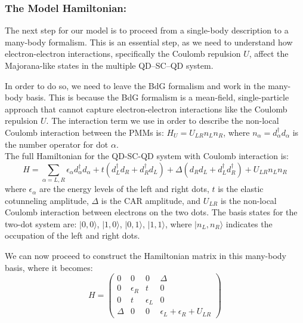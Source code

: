 \documentclass[11pt, letterpaper, titlepage]{article}
\begin{document}
\subsubsection{The Model Hamiltonian:} 
The next step for our model is to proceed from a single-body description to a many-body formalism. This is an essential step, as we need to understand how electron-electron interactions, specifically the Coulomb repulsion $U$, affect the Majorana-like states in the multiple QD–SC–QD system. \par
In order to do so, we need to leave the BdG formalism and work in the many-body basis. This is because the BdG formalism is a mean-field, single-particle approach that cannot capture electron-electron interactions like the Coulomb repulsion $U$. The interaction term we use in order to describe the non-local Coulomb interaction between the PMMs is: $H_U=U_{LR}n_Ln_R$, where $n_{α}=d_{α}^{†}d_{α}$ is the number operator for dot $α$.\\
The full Hamiltonian for the QD-SC-QD system with Coulomb interaction is:
$$
H = ∑_{α=L,R} ϵ_{α} d_{α}^{†}d_{α} + t (d_L^{†} d_R + d_R^{†} d_L) + Δ (d_R d_L + d_L^{†} d_R^{†})  + U_{LR} n_L n_R
$$
where $ϵ_{α}$ are the energy levels of the left and right dots, $t$ is the elastic cotunneling amplitude, $Δ$ is the CAR amplitude, and $U_{LR}$ is the non-local Coulomb interaction between electrons on the two dots. The basis states for the two-dot system are: $|0,0⟩$, $|1,0⟩$, $|0,1⟩$, $|1,1⟩$, where $|n_L,n_R⟩$ indicates the occupation of the left and right dots.\par
We can now proceed to construct the Hamiltonian matrix in this many-body basis, where it becomes:
\begin{equation}
H = \begin{pmatrix}
0 & 0 & 0 & Δ \\
0 & ϵ_R & t & 0 \\
0 & t & ϵ_L & 0 \\
Δ & 0 & 0 & ϵ_L + ϵ_R + U_{LR}
\end{pmatrix}
\label{eq:mbHamiltonian}
\end{equation}
\end{document}
